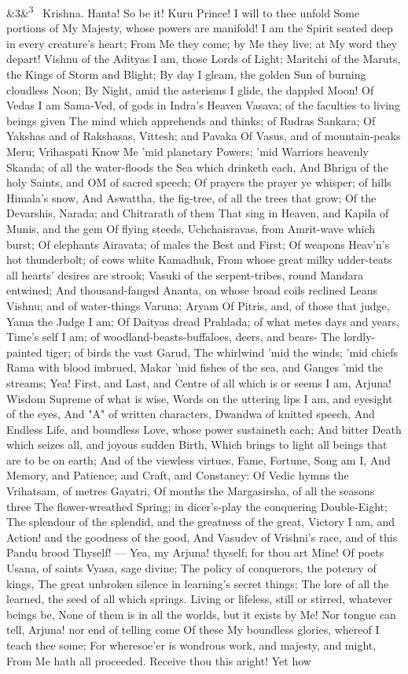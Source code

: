 \documentclass[12pt]{article}
\newcommand{\para}[1][]{\par\noindent\ifx&#1&\else\textsuperscript{\footnotesize #1}~\fi}
\begin{document}
\para[3] Krishna. Hanta! So be it! Kuru Prince! I will to thee unfold Some portions of My Majesty, whose powers are manifold! I am the Spirit seated deep in every creature's heart; From Me they come; by Me they live; at My word they depart! Vishnu of the Adityas I am, those Lords of Light; Maritchi of the Maruts, the Kings of Storm and Blight; By day I gleam, the golden Sun of burning cloudless Noon; By Night, amid the asterisms I glide, the dappled Moon! Of Vedas I am Sama-Ved, of gods in Indra's Heaven Vasava; of the faculties to living beings given The mind which apprehends and thinks; of Rudras Sankara; Of Yakshas and of Rakshasas, Vittesh; and Pavaka Of Vasus, and of mountain-peaks Meru; Vrihaspati Know Me 'mid planetary Powers; 'mid Warriors heavenly Skanda; of all the water-floods the Sea which drinketh each, And Bhrigu of the holy Saints, and OM of sacred speech; Of prayers the prayer ye whisper; of hills Himala's snow, And Aswattha, the fig-tree, of all the trees that grow; Of the Devarshis, Narada; and Chitrarath of them That sing in Heaven, and Kapila of Munis, and the gem Of flying steeds, Uchchaisravas, from Amrit-wave which burst; Of elephants Airavata; of males the Best and First; Of weapons Heav'n's hot thunderbolt; of cows white Kamadhuk, From whose great milky udder-teats all hearts' desires are strook; Vasuki of the serpent-tribes, round Mandara entwined; And thousand-fanged Ananta, on whose broad coils reclined Leans Vishnu; and of water-things Varuna; Aryam Of Pitris, and, of those that judge, Yama the Judge I am; Of Daityas dread Prahlada; of what metes days and years, Time's self I am; of woodland-beasts-buffaloes, deers, and bears- The lordly-painted tiger; of birds the vast Garud, The whirlwind 'mid the winds; 'mid chiefs Rama with blood imbrued, Makar 'mid fishes of the sea, and Ganges 'mid the streams; Yea! First, and Last, and Centre of all which is or seems I am, Arjuna! Wisdom Supreme of what is wise, Words on the uttering lips I am, and eyesight of the eyes, And "A" of written characters, Dwandwa of knitted speech, And Endless Life, and boundless Love, whose power sustaineth each; And bitter Death which seizes all, and joyous sudden Birth, Which brings to light all beings that are to be on earth; And of the viewless virtues, Fame, Fortune, Song am I, And Memory, and Patience; and Craft, and Constancy: Of Vedic hymns the Vrihatsam, of metres Gayatri, Of months the Margasirsha, of all the seasons three The flower-wreathed Spring; in dicer's-play the conquering Double-Eight; The splendour of the splendid, and the greatness of the great, Victory I am, and Action! and the goodness of the good, And Vasudev of Vrishni's race, and of this Pandu brood Thyself! --- Yea, my Arjuna! thyself; for thou art Mine! Of poets Usana, of saints Vyasa, sage divine; The policy of conquerors, the potency of kings, The great unbroken silence in learning's secret things; The lore of all the learned, the seed of all which springs. Living or lifeless, still or stirred, whatever beings be, None of them is in all the worlds, but it exists by Me! Nor tongue can tell, Arjuna! nor end of telling come Of these My boundless glories, whereof I teach thee some; For wheresoe'er is wondrous work, and majesty, and might, From Me hath all proceeded. Receive thou this aright! Yet how 
\end{document}
